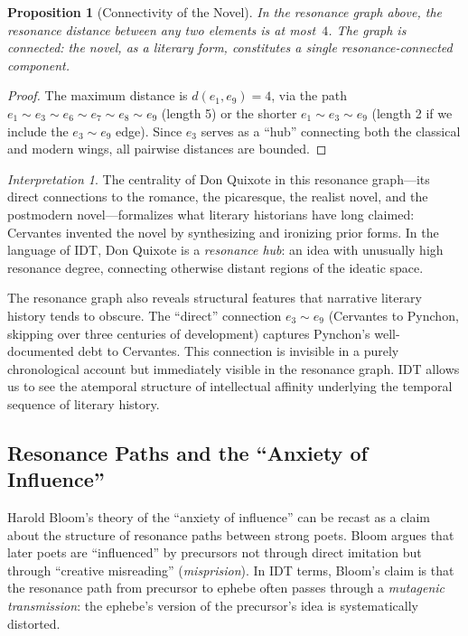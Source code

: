 \documentclass[11pt,openany]{book}
\theoremstyle{definition}
\theoremstyle{plain}
\newtheorem{proposition}[axiom]{Proposition}
\theoremstyle{remark}
\newtheorem{interpretation}[axiom]{Interpretation}
\newcommand{\res}{\sim}                      %
\begin{document}
\begin{proposition}[Connectivity of the Novel]
In the resonance graph above, the resonance distance between any two elements is at most~$4$. The graph is connected: the novel, as a literary form, constitutes a single resonance-connected component.
\end{proposition}

\begin{proof}
The maximum distance is $d(e_1, e_9) = 4$, via the path $e_1 \res e_3 \res e_6 \res e_7 \res e_8 \res e_9$ (length 5) or the shorter $e_1 \res e_3 \res e_9$ (length 2 if we include the $e_3 \res e_9$ edge). Since $e_3$ serves as a ``hub'' connecting both the classical and modern wings, all pairwise distances are bounded.
\end{proof}

\begin{interpretation}
The centrality of Don Quixote in this resonance graph---its direct connections to the romance, the picaresque, the realist novel, and the postmodern novel---formalizes what literary historians have long claimed: Cervantes invented the novel by synthesizing and ironizing prior forms. In the language of IDT, Don Quixote is a \emph{resonance hub}: an idea with unusually high resonance degree, connecting otherwise distant regions of the ideatic space.

The resonance graph also reveals structural features that narrative literary history tends to obscure. The ``direct'' connection $e_3 \res e_9$ (Cervantes to Pynchon, skipping over three centuries of development) captures Pynchon's well-documented debt to Cervantes. This connection is invisible in a purely chronological account but immediately visible in the resonance graph. IDT allows us to see the atemporal structure of intellectual affinity underlying the temporal sequence of literary history.
\end{interpretation}

\subsection{Resonance Paths and the ``Anxiety of Influence''}

Harold Bloom's theory of the ``anxiety of influence'' can be recast as a claim about the structure of resonance paths between strong poets. Bloom argues that later poets are ``influenced'' by precursors not through direct imitation but through ``creative misreading'' (\emph{misprision}). In IDT terms, Bloom's claim is that the resonance path from precursor to ephebe often passes through a \emph{mutagenic transmission}: the ephebe's version of the precursor's idea is systematically distorted.
\end{document}
